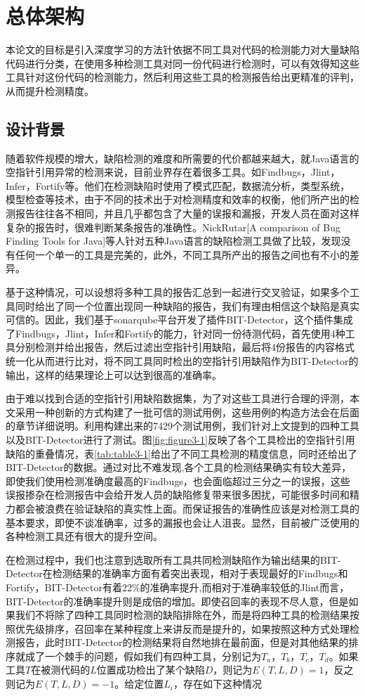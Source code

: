 \chapter{总体架构}
本论文的目标是引入深度学习的方法针依据不同工具对代码的检测能力对大量缺陷代码进行分类，在使用多种检测工具对同一份代码进行检测时，可以有效得知这些工具针对这份代码的检测能力，然后利用这些工具的检测报告给出更精准的评判，从而提升检测精度。
\section{设计背景}
随着软件规模的增大，缺陷检测的难度和所需要的代价都越来越大，就Java语言的空指针引用异常的检测来说，目前业界存在着很多工具。如Findbugs，Jlint，Infer，Fortify等。他们在检测缺陷时使用了模式匹配，数据流分析，类型系统，模型检查等技术，由于不同的技术出于对检测精度和效率的权衡，他们所产出的检测报告往往各不相同，并且几乎都包含了大量的误报和漏报，开发人员在面对这样复杂的报告时，很难判断某条报告的准确性。NickRutar[A comparison of Bug Finding Tools for Java]等人针对五种Java语言的缺陷检测工具做了比较，发现没有任何一个单一的工具是完美的，此外，不同工具所产出的报告之间也有不小的差异。

基于这种情况，可以设想将多种工具的报告汇总到一起进行交叉验证，如果多个工具同时给出了同一个位置出现同一种缺陷的报告，我们有理由相信这个缺陷是真实可信的。因此，我们基于sonarqube平台开发了插件BIT-Detector，这个插件集成了Findbugs，Jlint，Infer和Fortify的能力，针对同一份待测代码，首先使用4种工具分别检测并给出报告，然后过滤出空指针引用缺陷，最后将4份报告的内容格式统一化从而进行比对，将不同工具同时检出的空指针引用缺陷作为BIT-Detector的输出，这样的结果理论上可以达到很高的准确率。

由于难以找到合适的空指针引用缺陷数据集，为了对这些工具进行合理的评测，本文采用一种创新的方式构建了一批可信的测试用例，这些用例的构造方法会在后面的章节详细说明。利用构建出来的7429个测试用例，我们针对上文提到的四种工具以及BIT-Detector进行了测试。图\ref{fig:figure3-1}反映了各个工具检出的空指针引用缺陷的重叠情况，表\ref{tab:table3-1}给出了不同工具检测的精度信息，同时还给出了BIT-Detector的数据。通过对比不难发现,各个工具的检测结果确实有较大差异，即使我们使用检测准确度最高的Findbugs，也会面临超过三分之一的误报，这些误报掺杂在检测报告中会给开发人员的缺陷修复带来很多困扰，可能很多时间和精力都会被浪费在验证缺陷的真实性上面。而保证报告的准确性应该是对检测工具的基本要求，即使不谈准确率，过多的漏报也会让人沮丧。显然，目前被广泛使用的各种检测工具还有很大的提升空间。

在检测过程中，我们也注意到选取所有工具共同检测缺陷作为输出结果的BIT-Detector在检测结果的准确率方面有着突出表现，相对于表现最好的Findbugs和Fortify，BIT-Detector有着22\%的准确率提升,而相对于准确率较低的Jlint而言，BIT-Detector的准确率提升则是成倍的增加。即使召回率的表现不尽人意，但是如果我们不将除了四种工具同时检测的缺陷排除在外，而是将四种工具的检测结果按照优先级排序，召回率在某种程度上来讲反而是提升的，如果按照这种方式处理检测报告，此时BIT-Detector的检测结果将自然地排在最前面，但是对其他结果的排序就成了一个棘手的问题，假如我们有四种工具，分别记为$T_{a}$，$T_{b}$，$T_{c}$，$T_{d}$。如果工具$T$在被测代码的$L$位置成功检出了某个缺陷$D$，则记为$E(T,L,D)=1$，反之则记为$E(T,L,D)=-1$。给定位置$L_{i}$，存在如下这种情况

